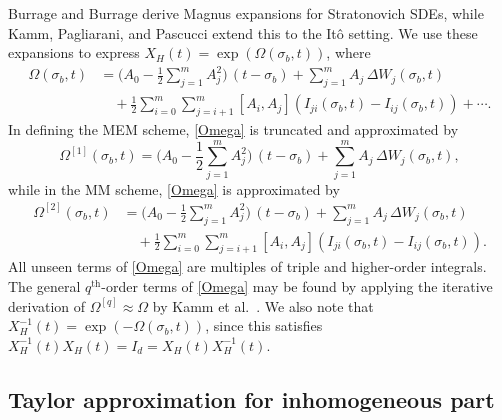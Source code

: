 \documentclass[onefignum]{siamart250211}
\begin{document}
Burrage and Burrage \cite{BurrageBurrage1999} derive Magnus expansions for Stratonovich SDEs, while Kamm, Pagliarani, and Pascucci \cite{Kamm2021} extend this to the It\^o setting. We use these expansions to express $X_H(t)=\exp(\Omega(\sigma_b,t))$, where
\begin{align}
\Omega(\sigma_b,t)&=\bigg(A_0-\frac{1}{2}\sum_{j=1}^mA_j^2\bigg)\,(t-\sigma_b)+\sum_{j=1}^mA_j\,\Delta W_j(\sigma_b,t)\label{Omega}\\
&\quad+\frac{1}{2}\sum_{i=0}^m\sum_{j=i+1}^m[A_i,A_j](I_{ji}(\sigma_b,t)-I_{ij}(\sigma_b,t))+\cdots.\nonumber
\end{align}
In defining the MEM scheme, \cref{Omega} is truncated and approximated by
\begin{equation}
\Omega^{[1]}(\sigma_b,t)=\bigg(A_0-\frac{1}{2}\sum_{j=1}^mA_j^2\bigg)\,(t-\sigma_b)+\sum_{j=1}^mA_j\,\Delta W_j(\sigma_b,t),\label{Omega1}
\end{equation}
while in the MM scheme, \cref{Omega} is approximated by
\begin{align}
\Omega^{[2]}(\sigma_b,t)&=\bigg(A_0-\frac{1}{2}\sum_{j=1}^mA_j^2\bigg)\,(t-\sigma_b)+\sum_{j=1}^mA_j\,\Delta W_j(\sigma_b,t)\label{Omega2}\\
&\quad+\frac{1}{2}\sum_{i=0}^m\sum_{j=i+1}^m[A_i,A_j](I_{ji}(\sigma_b,t)-I_{ij}(\sigma_b,t)).\nonumber
\end{align}
All unseen terms of \cref{Omega} are multiples of triple and higher-order integrals. The general $q^\mathrm{th}$-order terms of \cref{Omega} may be found by applying the iterative derivation of $\Omega^{[q]}\approx\Omega$ by Kamm et al.\ \cite{Kamm2021}. We also note that $X_H^{-1}(t)=\exp(-\Omega(\sigma_b,t))$, since this satisfies $X_H^{-1}(t)X_H(t)=I_d=X_H(t)X_H^{-1}(t)$.

























\subsection{Taylor approximation for inhomogeneous part}
\end{document}
